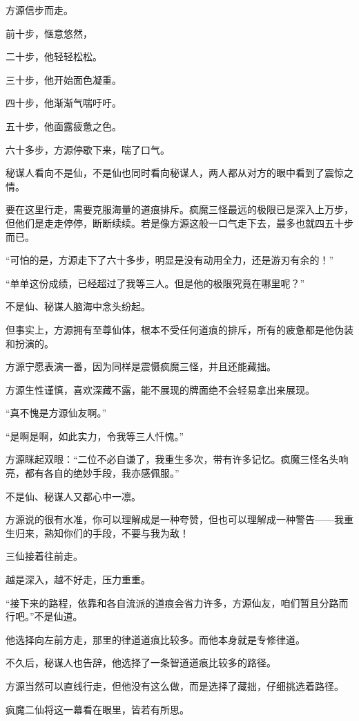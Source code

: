 \begin{this_body}
方源信步而走。

前十步，惬意悠然，

二十步，他轻轻松松。

三十步，他开始面色凝重。

四十步，他渐渐气喘吁吁。

五十步，他面露疲惫之色。

六十多步，方源停歇下来，喘了口气。

秘谋人看向不是仙，不是仙也同时看向秘谋人，两人都从对方的眼中看到了震惊之情。

要在这里行走，需要克服海量的道痕排斥。疯魔三怪最远的极限已是深入上万步，但他们是走走停停，断断续续。若是像方源这般一口气走下去，最多也就四五十步而已。

“可怕的是，方源走下了六十多步，明显是没有动用全力，还是游刃有余的！”

“单单这份成绩，已经超过了我等三人。但是他的极限究竟在哪里呢？”

不是仙、秘谋人脑海中念头纷起。

但事实上，方源拥有至尊仙体，根本不受任何道痕的排斥，所有的疲惫都是他伪装和扮演的。

方源宁愿表演一番，因为同样是震慑疯魔三怪，并且还能藏拙。

方源生性谨慎，喜欢深藏不露，能不展现的牌面绝不会轻易拿出来展现。

“真不愧是方源仙友啊。”

“是啊是啊，如此实力，令我等三人忏愧。”

方源眯起双眼：“二位不必自谦了，我重生多次，带有许多记忆。疯魔三怪名头响亮，都有各自的绝妙手段，我亦感佩服。”

不是仙、秘谋人又都心中一凛。

方源说的很有水准，你可以理解成是一种夸赞，但也可以理解成一种警告——我重生归来，熟知你们的手段，不要与我为敌！

三仙接着往前走。

越是深入，越不好走，压力重重。

“接下来的路程，依靠和各自流派的道痕会省力许多，方源仙友，咱们暂且分路而行吧。”不是仙道。

他选择向左前方走，那里的律道道痕比较多。而他本身就是专修律道。

不久后，秘谋人也告辞，他选择了一条智道道痕比较多的路径。

方源当然可以直线行走，但他没有这么做，而是选择了藏拙，仔细挑选着路径。

疯魔二仙将这一幕看在眼里，皆若有所思。

\end{this_body}

